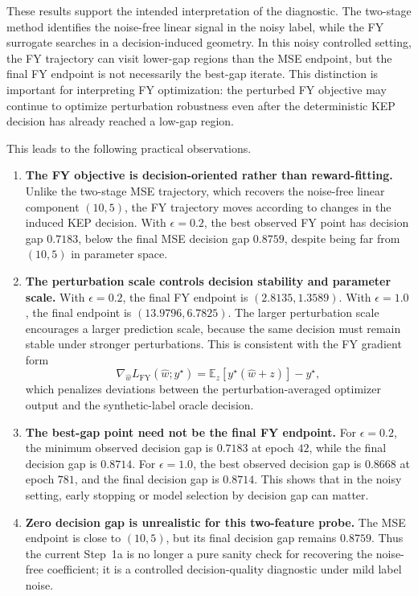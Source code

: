 \documentclass{article}
\begin{document}
These results support the intended interpretation of the diagnostic. The
two-stage method identifies the noise-free linear signal in the noisy label, while
the FY surrogate searches in a decision-induced geometry. In this noisy
controlled setting, the FY trajectory can visit lower-gap regions than the
MSE endpoint, but the final FY endpoint is not necessarily the best-gap
iterate. This distinction is important for interpreting FY optimization: the
perturbed FY objective may continue to optimize perturbation robustness even
after the deterministic KEP decision has already reached a low-gap region.

This leads to the following practical observations.
\begin{enumerate}
    \item \textbf{The FY objective is decision-oriented rather than reward-fitting.}
    Unlike the two-stage MSE trajectory, which recovers the noise-free linear component
    \((10,5)\), the FY trajectory moves according to changes in the induced KEP
    decision. With \(\epsilon=0.2\), the best observed FY point has decision gap
    \(0.7183\), below the final MSE decision gap \(0.8759\), despite being far
    from \((10,5)\) in parameter space.

    \item \textbf{The perturbation scale controls decision stability and
    parameter scale.}
    With \(\epsilon=0.2\), the final FY endpoint is
    \((2.8135,1.3589)\). With \(\epsilon=1.0\), the final endpoint is
    \((13.9796,6.7825)\). The larger perturbation scale encourages a larger
    prediction scale, because the same decision must remain stable under
    stronger perturbations. This is consistent with the FY gradient form
\[
    \nabla_{\hat w} L_{\mathrm{FY}}(\hat w; y^\star)
    =
    \mathbb{E}_{z}\!\left[y^\star(\hat w + z)\right] - y^\star,
\]
    which penalizes deviations between the perturbation-averaged optimizer
    output and the synthetic-label oracle decision.

    \item \textbf{The best-gap point need not be the final FY endpoint.}
    For \(\epsilon=0.2\), the minimum observed decision gap is \(0.7183\) at
    epoch \(42\), while the final decision gap is \(0.8714\). For
    \(\epsilon=1.0\), the best observed decision gap is \(0.8668\) at epoch
    \(781\), and the final decision gap is \(0.8714\). This shows that in the
    noisy setting, early stopping or model selection by decision gap can matter.

    \item \textbf{Zero decision gap is unrealistic for this two-feature probe.}
    The MSE endpoint is close to \((10,5)\), but its final decision gap remains
    \(0.8759\). Thus the current Step~1a is no longer a pure sanity check for
    recovering the noise-free coefficient; it is a controlled
    decision-quality diagnostic under mild label noise.
\end{enumerate}
\end{document}
